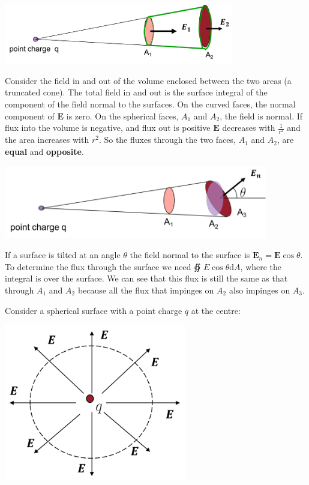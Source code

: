 \documentclass[
]{book}
\numberwithin{equation}{section}
\begin{document}
\includegraphics[width=100mm,height=\textheight]{Figures/elecFlux1.png} \protect\hypertarget{fig:elecFlux1}{}{}

Consider the field in and out of the volume enclosed between the two
areas (a truncated cone). The total field in and out is the surface
integral of the component of the field normal to the surfaces. On the
curved faces, the normal component of \(\mathbf{E}\) is zero. On the spherical
faces, \(A_1\) and \(A_2\), the field is normal. If flux into the volume is
negative, and flux out is positive \(\mathbf{E}\) decreases with \(\frac{1}{r^2}\)
and the area increases with \(r^2\). So the fluxes through the two faces,
\(A_1\) and \(A_2\), are \textbf{equal} and \textbf{opposite}.

\includegraphics[width=115mm,height=\textheight]{Figures/elecFlux2.png} \protect\hypertarget{fig:elecFlux2}{}{}

If a surface is tilted at an angle \(\theta\) the field normal to the
surface is \(\mathbf{E}_n = \mathbf{E} \cos\theta\). To determine the flux through the
surface we need ∯ \(E \cos\theta \mathrm{d} A\), where the integral is over
the surface. We can see that this flux is still the same as that through
\(A_1\) and \(A_2\) because all the flux that impinges on \(A_2\) also
impinges on \(A_3\).

Consider a spherical surface with a point charge \(q\) at the centre:

\includegraphics[width=80mm,height=\textheight]{Figures/elecFlux3.png} \protect\hypertarget{fig:elecFlux3}{}{}
\end{document}
